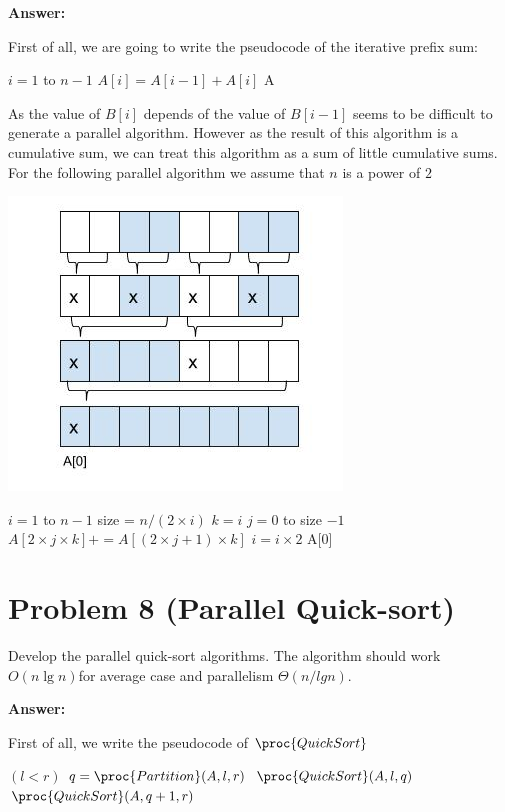 \documentclass{article}
\begin{document}
\textbf{Answer: }

First of all, we are going to write the pseudocode of the iterative prefix sum: 
\begin{codebox}
\li \For $i = 1$ to $n -1$ \Do
\li $A[i]=A[i-1] + A[i]$ \End
\li \Return A
\end{codebox}

As the value of $B[i]$ depends of the value of  $B[i-1]$ seems to be difficult to generate a parallel algorithm. However as the result of this algorithm is a cumulative sum, we can treat this algorithm as a sum of little cumulative sums. For the following parallel algorithm we assume that $n$ is a power of $2$

\begin{center}
\includegraphics[scale=.5]{ej7.jpg} 
\end{center}

\begin{codebox}
\li \For $i = 1$ to $n -1$ \Do
\li size = $n/(2\times i)$
\li $k = i$
\li \For $j= 0$ to size $- 1$ \Do
\li $A[2\times j \times k]+= A[(2\times j+1)\times k]$ \End 
\li $i = i \times 2$ \End
\li \Return A[0]
\end{codebox}


\section*{Problem 8 (Parallel Quick-sort)}

Develop the parallel quick-sort algorithms. The algorithm should work $O(n \lg n)$for average case and parallelism $\Theta(n/lgn)$.

\textbf{Answer:}

First of all, we write the pseudocode of $\proc{QuickSort}$
\begin{codebox}
\li \If $(l<r)$ \Do
\li $q = \proc{Partition}(A, l, r)$
\li $\proc{QuickSort}(A,l, q)$
\li $\proc{QuickSort}(A,q+1, r)$
\end{codebox}
\end{document}
